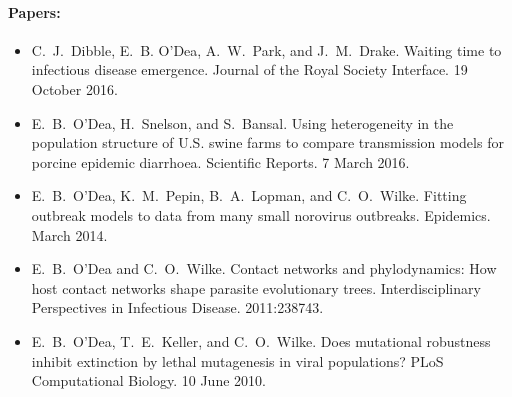 \documentclass[a4paper]{article}
\begin{document}
\paragraph{Papers:} 
\begin{itemize}
  \item[~] C.\ J.\ Dibble, E.\ B. O'Dea, A.\ W.\ Park, and
    J.\ M.\ Drake. Waiting time to infectious disease
    emergence. Journal of the Royal Society Interface. 19 October 2016.
  \item[~] E.\ B.\ O'Dea, H.\ Snelson, and S.\ Bansal. Using
    heterogeneity in the population structure of U.S. swine farms to
    compare transmission models for porcine epidemic
    diarrhoea. Scientific Reports. 7 March 2016.
  \item[~] E.\ B.\ O'Dea, K.\ M.\ Pepin, B.\ A.\ Lopman, and
    C.\ O.\ Wilke. Fitting outbreak models to data from many small
    norovirus outbreaks. Epidemics. March 2014.
  \item[~] E.\ B.\ O'Dea and C.\ O.\ Wilke. Contact networks and
    phylodynamics: How host contact networks shape parasite
    evolutionary trees. Interdisciplinary Perspectives in Infectious
    Disease. 2011:238743.
  \item[~] E.\ B.\ O'Dea, T.\ E.\ Keller, and C.\ O.\ Wilke. Does
    mutational robustness inhibit extinction by lethal mutagenesis in
    viral populations? PLoS Computational Biology. 10 June 2010.
\end{itemize}
\end{document}
